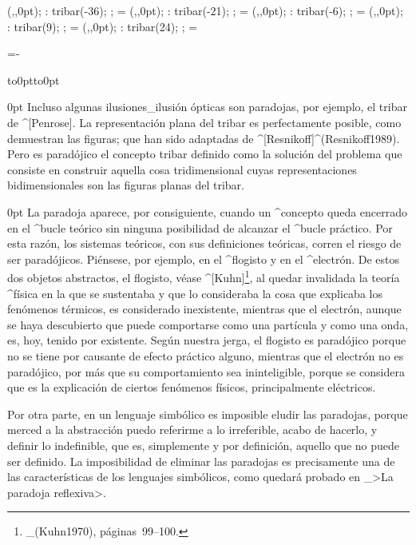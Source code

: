  \newdimen\tribar \tribar=75pt

 \MTbeginchar(\the\tribar,\the\tribar,0pt);
 \MT: tribar(-36);
 \MTendchar; =\box\MTbox
 \MTbeginchar(\the\tribar,\the\tribar,0pt);
 \MT: tribar(-21);
 \MTendchar; =\box\MTbox
 \MTbeginchar(\the\tribar,\the\tribar,0pt);
 \MT: tribar(-6);
 \MTendchar; =\box\MTbox
 \MTbeginchar(\the\tribar,\the\tribar,0pt);
 \MT: tribar(9);
 \MTendchar; =\box\MTbox
 \MTbeginchar(\the\tribar,\the\tribar,0pt);
 \MT: tribar(24);
 \MTendchar; =\box\MTbox

 =\hsize \advance{}-\tribar

 \nointerlineskip\hbox to0pt{\kern{}\vbox to0pt{\kern-9pt
 \kern-10pt\kern-9pt\kern-9pt\kern-12pt\vss}\hss}%
 \nointerlineskip

\strut{} 0pt 
Incluso algunas ilusiones_{ilusión} ópticas son paradojas, por ejemplo,
el tribar de ^[Penrose]. La representación plana del tribar es
perfectamente posible, como demuestran las figuras; que han sido
adaptadas de ^[Resnikoff]^(Resnikoff1989). Pero es paradójico el
concepto tribar definido como la solución del problema que consiste en
construir aquella cosa tridimensional cuyas representaciones
bidimensionales son las figuras planas del tribar.

\strut{} 0pt 
La paradoja aparece, por consiguiente, cuando un ^{concepto} queda
encerrado en el ^{bucle teórico} sin ninguna posibilidad de alcanzar el
^{bucle práctico}. Por esta razón, los sistemas teóricos, con sus
definiciones teóricas, corren el riesgo de ser paradójicos. Piénsese,
por ejemplo, en el ^{flogisto} y en el ^{electrón}. De estos dos objetos
abstractos, el flogisto, véase ^[Kuhn]\footnote{_(Kuhn1970),
pá\-gi\-nas~99--100.}, al quedar invalidada la teoría ^{física} en la
que se sustentaba y que lo consideraba la cosa que explicaba los
fenómenos térmicos, es considerado inexistente, mientras que el
electrón, aunque se haya descubierto que puede comportarse como una
partícula y como una onda, es, hoy, tenido por existente. Según nuestra
jerga, el flogisto es paradójico porque no se tiene por causante de
efecto práctico alguno, mientras que el electrón no es paradójico, por
más que su comportamiento sea ininteligible, porque se considera que es
la explicación de ciertos fenómenos físicos, principalmente eléctricos.

Por otra parte, en un lenguaje simbólico es imposible eludir las
paradojas, porque merced a la abstracción puedo referirme a lo
irreferible, acabo de hacerlo, y definir lo indefinible, que es,
simplemente y por definición, aquello que no puede ser definido. La
imposibilidad de eliminar las paradojas es precisamente una de las
características de los lenguajes simbólicos, como quedará probado en
_>La paradoja reflexiva>.


